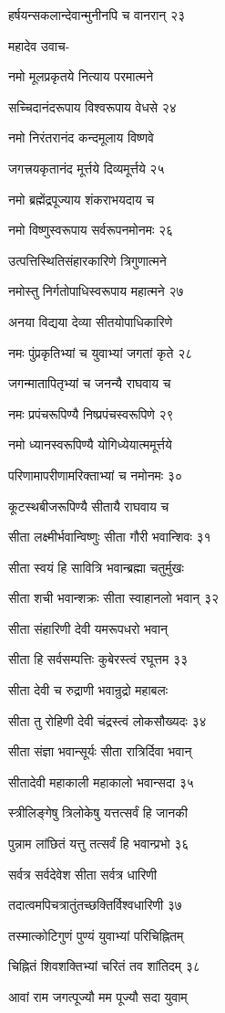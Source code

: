 हर्षयन्सकलान्देवान्मुनीनपि च वानरान् २३

महादेव उवाच-

नमो मूलप्रकृतये नित्याय परमात्मने

सच्चिदानंदरूपाय विश्वरूपाय वेधसे २४

नमो निरंतरानंद कन्दमूलाय विष्णवे

जगत्त्रयकृतानंद मूर्त्तये दिव्यमूर्त्तये २५

नमो ब्रह्मेंद्रपूज्याय शंकराभयदाय च

नमो विष्णुस्वरूपाय सर्वरूपनमोनमः २६

उत्पत्तिस्थितिसंहारकारिणे त्रिगुणात्मने

नमोस्तु निर्गतोपाधिस्वरूपाय महात्मने २७

अनया विद्यया देव्या सीतयोपाधिकारिणे

नमः पुंप्रकृतिभ्यां च युवाभ्यां जगतां कृते २८

जगन्मातापितृभ्यां च जनन्यै राघवाय च

नमः प्रपंचरूपिण्यै निष्प्रपंचस्वरूपिणे २९

नमो ध्यानस्वरूपिण्यै योगिध्येयात्ममूर्त्तये

परिणामापरीणामरिक्ताभ्यां च नमोनमः ३०

कूटस्थबीजरूपिण्यै सीतायै राघवाय च

सीता लक्ष्मीर्भवान्विष्णुः सीता गौरी भवान्शिवः ३१

सीता स्वयं हि सावित्रि भवान्ब्रह्मा चतुर्मुखः

सीता शची भवान्शक्रः सीता स्वाहानलो भवान् ३२

सीता संहारिणी देवी यमरूपधरो भवान्

सीता हि सर्वसम्पत्तिः कुबेरस्त्वं रघूत्तम ३३

सीता देवी च रुद्राणी भवान्रुद्रो महाबलः

सीता तु रोहिणी देवी चंद्रस्त्वं लोकसौख्यदः ३४

सीता संज्ञा भवान्सूर्यः सीता रात्रिर्दिवा भवान्

सीतादेवी महाकाली महाकालो भवान्सदा ३५

स्त्रीलिङ्गेषु त्रिलोकेषु यत्तत्सर्वं हि जानकी

पुन्नाम लांछितं यत्तु तत्सर्वं हि भवान्प्रभो ३६

सर्वत्र सर्वदेवेश सीता सर्वत्र धारिणी

तदात्वमपिचत्रातुंतच्छक्तिर्विश्वधारिणी ३७

तस्मात्कोटिगुणं पुण्यं युवाभ्यां परिचिह्नितम्

चिह्नितं शिवशक्तिभ्यां चरितं तव शांतिदम् ३८

आवां राम जगत्पूज्यौ मम पूज्यौ सदा युवाम्

